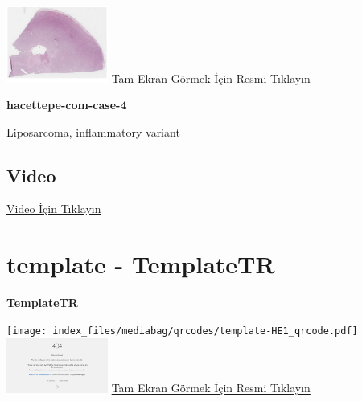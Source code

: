\documentclass[
  letterpaper,
  DIV=11,
  numbers=noendperiod]{scrreprt}
\begin{document}
\href{https://images.patolojiatlasi.com/hacettepe-com-case-4/HE2.html}{\includegraphics[width=0.25\textwidth,height=\textheight]{./screenshots/thumbnail_hacettepe-com-case-4-2.png}}
\href{https://images.patolojiatlasi.com/hacettepe-com-case-4/HE2.html}{Tam
Ekran Görmek İçin Resmi Tıklayın}

\textbf{hacettepe-com-case-4}

\begin{tcolorbox}[enhanced jigsaw, breakable, opacitybacktitle=0.6, arc=.35mm, colbacktitle=quarto-callout-tip-color!10!white, colback=white, toptitle=1mm, left=2mm, opacityback=0, colframe=quarto-callout-tip-color-frame, titlerule=0mm, rightrule=.15mm, bottomrule=.15mm, toprule=.15mm, bottomtitle=1mm, title=\textcolor{quarto-callout-tip-color}{\faLightbulb}\hspace{0.5em}{Tanı}, coltitle=black, leftrule=.75mm]

Liposarcoma, inflammatory variant

\end{tcolorbox}

\hypertarget{video-3}{%
\subsection{Video}\label{video-3}}

\href{https://www.youtube.com/watch?v=Akp6H3myCIo}{Video İçin Tıklayın}

\hypertarget{sec-template}{%
\section{template - TemplateTR}\label{sec-template}}

\textbf{TemplateTR}

\texttt{[image: index\_files/mediabag/qrcodes/template-HE1\_qrcode.pdf]}
\href{https://images.patolojiatlasi.com/template/HE1.html}{\includegraphics[width=0.25\textwidth,height=\textheight]{./screenshots/thumbnail_template-HE1.png}}
\href{https://images.patolojiatlasi.com/template/HE1.html}{Tam Ekran
Görmek İçin Resmi Tıklayın}
\end{document}
